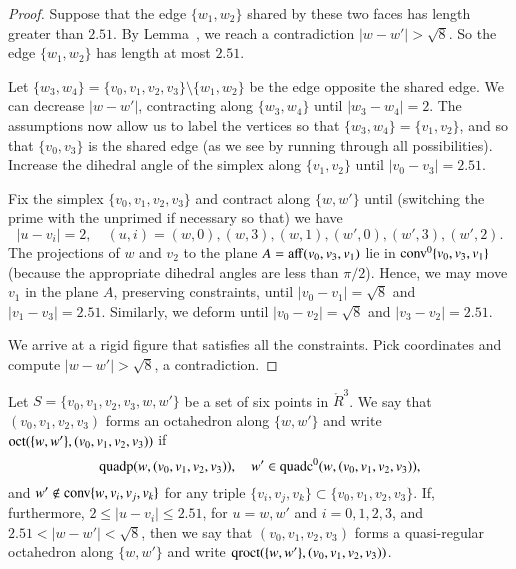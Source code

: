 \begin{tarskidata}
\begin{tarski}
\begin{proof}
Suppose that the edge $\{w_1,w_2\}$
shared by these two faces has length greater
than $2.51$.  By Lemma~, 
we reach a contradiction $|w-w'|>\sqrt8$.
So the edge $\{w_1,w_2\}$ has length at most $2.51$.

Let $\{w_3,w_4\} = \{v_0,v_1,v_2,v_3\}\setminus \{w_1,w_2\}$ be the
edge opposite the shared edge.  We can decrease $|w-w'|$, contracting
along $\{w_3,w_4\}$ until $|w_3-w_4|=2$.  The assumptions now allow
us to label the vertices so that $\{w_3,w_4\}=\{v_1,v_2\}$, and so
that
$\{v_0,v_3\}$ is the shared edge (as we see by running through
all possibilities).  Increase the dihedral angle
of the simplex along $\{v_1,v_2\}$ until $|v_0-v_3|=2.51$.

Fix the simplex $\{v_0,v_1,v_2,v_3\}$ and contract along $\{w,w'\}$
until (switching the prime with the unprimed if necessary so that) we have
  $$
  |u-v_i| = 2,\quad (u,i)=(w,0),(w,3),(w,1), (w',0), (w',3),(w',2).
  $$
The projections of $w$ and $v_2$ to the plane $A={\operatorname{aff}}(v_0,v_3,v_1)$
lie in ${\operatorname{conv}}^0\{v_0,v_3,v_1\}$ (because the appropriate dihedral
angles are less than $\pi/2$).  Hence, we may move
$v_1$ in the plane $A$, preserving constraints,
until $|v_0-v_1|=\sqrt8$ and $|v_1-v_3|=2.51$.
Similarly, we deform until $|v_0-v_2|=\sqrt8$ and $|v_3-v_2|=2.51$.

We arrive at a rigid figure that satisfies all the constraints.
Pick coordinates and compute $|w-w'| > \sqrt8$, a contradiction.
\end{proof}
\end{tarski}







\begin{tarski}

\begin{definition}[octahedron]
Let $S=\{v_0,v_1,v_2,v_3,w,w'\}$ be a set of six points in $\ring{R}^3$.
We say that $(v_0,v_1,v_2,v_3)$ forms an octahedron along $\{w,w'\}$ and write
${\operatorname{oct}}(\{w,w'\},(v_0,v_1,v_2,v_3))$ if
$$
  {\operatorname{quadp}}(w,(v_0,v_1,v_2,v_3)),\quad
   w'\in{\operatorname{quadc}}^0(w,(v_0,v_1,v_2,v_3)),
$$
and $w'\not\in{\operatorname{conv}}\{w,v_i,v_j,v_k\}$ for any triple
$\{v_i,v_j,v_k\}\subset \{v_0,v_1,v_2,v_3\}$.
If, furthermore, $2\le |u-v_i|\le 2.51$, for $u=w,w'$ and $i=0,1,2,3$,
and $2.51<|w-w'|<\sqrt8$, then we say that 
$(v_0,v_1,v_2,v_3)$ forms a quasi-regular octahedron along
 $\{w,w'\}$ and write
${\operatorname{qroct}}(\{w,w'\},(v_0,v_1,v_2,v_3))$.
\end{definition}
\end{tarski}




\end{tarskidata}
